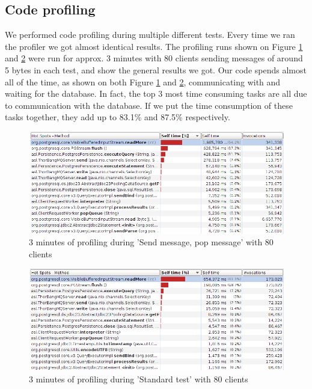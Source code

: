 \documentclass{article}
\begin{document}
        \subsection{Code profiling}
            We performed code profiling during multiple different tests. Every time we ran the profiler we got almost identical results. The profiling runs shown on Figure \ref{fig:code_profiling_send_pop_same_client} and \ref{fig:code_profiling_standard_test} were run for approx. 3 minutes with 80 clients sending messages of around 5 bytes in each test, and show the general results we got.  Our code spends almost all of the time, as shown on both Figure \ref{fig:code_profiling_send_pop_same_client} and \ref{fig:code_profiling_standard_test}, communicating with and waiting for the database. In fact, the top 3 most time consuming tasks are all due to communication with the database. If we put the time consumption of these tasks together, they add up to 83.1\% and 87.5\% respectively.
            \begin{figure}[H]
                \hspace{-1.5cm}
                \includegraphics[scale=0.50]{code_profiling_send_pop_same_client}
                \caption{3 minutes of profiling during 'Send message, pop message' with 80 clients}
                \label{fig:code_profiling_send_pop_same_client}
            \end{figure}
            \begin{figure}[H]
                \hspace{-1.5cm}
                \includegraphics[scale=0.50]{code_profiling_standard_test}
                \caption{3 minutes of profiling during 'Standard test' with 80 clients}
                \label{fig:code_profiling_standard_test}
            \end{figure}
\end{document}
